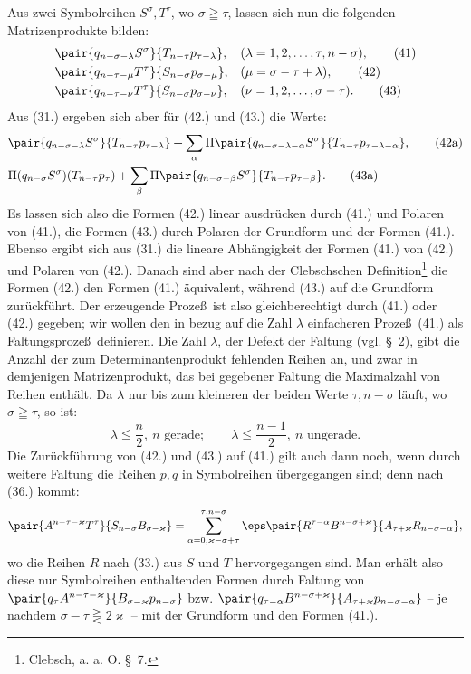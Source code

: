Aus zwei Symbolreihen $S^\sigma,T^\tau$, wo $\sigma\geqq\tau$, lassen sich nun die folgenden Matrizenprodukte bilden:
\begin{align}
&\pair{q_{n-\sigma-\lambda}S^\sigma}{T_{n-\tau}p_{\tau-\lambda}}, &&(\lambda=1,2,\ldots,\tau,n-\sigma),\tag{41}\\
&\pair{q_{n-\tau-\mu}T^\tau}{S_{n-\sigma}p_{\sigma-\mu}}, &&(\mu=\sigma-\tau+\lambda),\tag{42}\\
&\pair{q_{n-\tau-\nu}T^\tau}{S_{n-\sigma}p_{\sigma-\nu}}, &&(\nu=1,2,\ldots,\sigma-\tau).
\tag{43}
\end{align}
Aus (31.) ergeben sich aber f\"ur (42.) und (43.) die Werte:
\begin{align}
&\pair{q_{n-\sigma-\lambda}S^\sigma}{T_{n-\tau}p_{\tau-\lambda}}
 +\sum_{\alpha}\Pi\pair{q_{n-\sigma-\lambda-\alpha}S^\sigma}{T_{n-\tau}p_{\tau-\lambda-\alpha}},\tag{42a}\\
&\Pi(q_{n-\sigma}S^\sigma)(T_{n-\tau}p_\tau)
 +\sum_{\beta}\Pi\pair{q_{n-\sigma-\beta}S^\sigma}{T_{n-\tau}p_{\tau-\beta}}.
\tag{43a}
\end{align}
Es lassen sich also die Formen (42.) linear ausdr\"ucken durch (41.) und Polaren von (41.), die Formen (43.) durch Polaren der Grundform und der Formen (41.). Ebenso ergibt sich aus (31.) die lineare Abh\"angigkeit der Formen (41.) von (42.) und Polaren von (42.). Danach sind aber nach der Clebschschen Definition\footnote{Clebsch, a. a. O. \S\ 7.} die Formen (42.) den Formen (41.) \"aquivalent, w\"ahrend (43.) auf die Grundform zur\"uckf\"uhrt. Der erzeugende Proze\ss\ ist also gleichberechtigt durch (41.) oder (42.) gegeben; wir wollen den in bezug auf die Zahl $\lambda$ einfacheren Proze\ss\ (41.) als Faltungsproze\ss\ definieren. Die Zahl $\lambda$, der Defekt der Faltung (vgl. \S\ 2), gibt die Anzahl der zum Determinantenprodukt fehlenden Reihen an, und zwar in demjenigen Matrizenprodukt, das bei gegebener Faltung die Maximalzahl von Reihen enth\"alt. Da $\lambda$ nur bis zum kleineren der beiden Werte $\tau,n-\sigma$ l\"auft, wo $\sigma\geqq\tau$, so ist:
\begin{equation}
 \lambda\leqq\frac n2,\ n\text{ gerade};\qquad
 \lambda\leqq\frac{n-1}{2},\ n\text{ ungerade}.
\tag{44}
\end{equation}
Die Zur\"uckf\"uhrung von (42.) und (43.) auf (41.) gilt auch dann noch, wenn durch weitere Faltung die Reihen $p,q$ in Symbolreihen \"ubergegangen sind; denn nach (36.) kommt:
\[
 \pair{A^{n-\tau-\varkappa}T^\tau}{S_{n-\sigma}B_{\sigma-\varkappa}}
 =\sum_{\alpha=0,\varkappa-\sigma+\tau}^{\tau,n-\sigma}
 \eps\pair{R^{\tau-\alpha}B^{n-\sigma+\varkappa}}{A_{\tau+\varkappa}R_{n-\sigma-\alpha}},
\]
wo die Reihen $R$ nach (33.) aus $S$ und $T$ hervorgegangen sind. Man erh\"alt also diese nur Symbolreihen enthaltenden Formen durch Faltung von $\pair{q_\tau A^{n-\tau-\varkappa}}{B_{\sigma-\varkappa}p_{n-\sigma}}$ bzw. $\pair{q_{\tau-\alpha}B^{n-\sigma+\varkappa}}{A_{\tau+\varkappa}p_{n-\sigma-\alpha}}$ -- je nachdem $\sigma-\tau\gtreqless 2\varkappa$ -- mit der Grundform und den Formen (41.).

